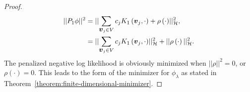 \begin{proof}
\begin{align*} 
\vert \vert P_1 \phi \vert\vert^2 &= \lvert \lvert \sum_{\mbox{\boldmath $v$}_j \in V} c_j K_1\left(\mbox{\boldmath $v$}_j, \cdot\right) + \rho\left(\cdot\right) \rvert \rvert_{\mathcal{H}}^2,\\
&= \lvert \lvert \sum_{\mbox{\boldmath $v$}_j \in V} c_j K_1\left(\mbox{\boldmath $v$}_j, \cdot\right) \rvert \rvert_{\mathcal{H}}^2 + \vert \vert \rho\left(\cdot\right) \vert \vert_{\mathcal{H}}^2.
\end{align*} 
\noindent
The penalized negative log likelihood is obviously minimized when $\vert \vert \rho \vert \vert^2 = 0$, or $\rho\left(\cdot\right) = 0$. This leads to the form of the minimizer for $\phi_\lambda$ as stated in Theorem~\ref{theorem:finite-dimensional-minimizer}.
 
\end{proof}
 
